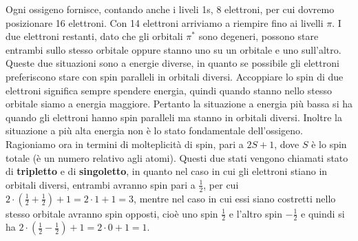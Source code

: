 Ogni ossigeno fornisce, contando anche i liveli 1s, 8 elettroni, per cui dovremo posizionare 16 elettroni. Con 14 elettroni arriviamo a riempire fino ai livelli $\pi$. I due elettroni restanti, dato che gli orbitali $\pi^*$ sono degeneri, possono stare entrambi sullo stesso orbitale oppure stanno uno su un orbitale e uno sull'altro. Queste due situazioni sono a energie diverse, in quanto se possibile gli elettroni preferiscono stare con spin paralleli in orbitali diversi. Accoppiare lo spin di due elettroni significa sempre spendere energia, quindi quando stanno nello stesso orbitale siamo a energia maggiore. Pertanto la situazione a energia più bassa si ha quando gli elettroni hanno spin paralleli ma stanno in orbitali diversi. Inoltre la situazione a più alta energia non è lo stato fondamentale dell'ossigeno.
\newpage
Ragioniamo ora in termini di molteplicità di spin, pari a $2S + 1$, dove $S$ è lo spin totale (è un numero relativo agli atomi). Questi due stati vengono chiamati stato di \textbf{tripletto} e di \textbf{singoletto}, in quanto nel caso in cui gli elettroni stiano in orbitali diversi, entrambi avranno spin pari a $\frac{1}{2}$, per cui $2 \cdot (\frac{1}{2} + \frac{1}{2})+1=2 \cdot 1 + 1=3$, mentre nel caso in cui essi siano costretti nello stesso orbitale avranno spin opposti, cioè uno spin $\frac{1}{2}$ e l'altro spin $-\frac{1}{2}$ e quindi si ha $2 \cdot (\frac{1}{2} - \frac{1}{2}) + 1= 2 \cdot 0 + 1=1$.

